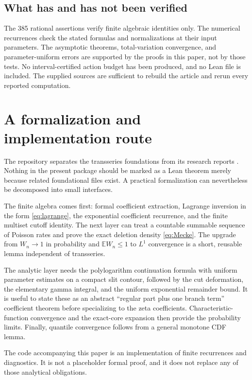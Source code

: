 \documentclass[11pt,a4paper]{article}
\theoremstyle{definition}\newtheorem{definition}[theorem]{Definition}
\theoremstyle{remark}\newtheorem{remark}[theorem]{Remark}
\newcommand{\E}{\mathbb E}
\newcommand{\1}{\mathbf 1}
\begin{document}
\subsection{What has and has not been verified}

The 385 rational assertions verify finite algebraic identities only.
The numerical recurrences check the stated formulas and normalizations
at their input parameters. The asymptotic theorems, total-variation
convergence, and parameter-uniform errors are supported by the proofs in
this paper, not by those tests. No interval-certified action budget has
been produced, and no Lean file is included. The supplied sources are
sufficient to rebuild the article and rerun every reported computation.

\section{A formalization and implementation route}
\label{sec:formalization}

The repository separates the transseries foundations from its research
reports \cite{repo-index}. Nothing in the present package should be
marked as a Lean theorem merely because related foundational files
exist. A practical formalization can nevertheless be decomposed into
small interfaces.

The finite algebra comes first: formal coefficient extraction,
Lagrange inversion in the form \eqref{eq:lagrange}, the exponential
coefficient recurrence, and the finite multiset cutoff identity. The
next layer can treat a countable summable sequence of Poisson rates and
prove the exact deletion density \eqref{eq:Mecke}. The upgrade from
$W_n\to1$ in probability and $\E W_n\le1$ to $L^1$ convergence is a
short, reusable lemma independent of transseries.

The analytic layer needs the polylogarithm continuation formula with
uniform parameter estimates on a compact slit contour, followed by the
cut deformation, the elementary gamma integral, and the uniform
exponential remainder bound. It is useful to state these as an abstract
``regular part plus one branch term'' coefficient theorem before
specializing to the zeta coefficients. Characteristic-function
convergence and the exact-core expansion then provide the probability
limits. Finally, quantile convergence follows from a general monotone
CDF lemma.

The code accompanying this paper is an implementation of finite
recurrences and diagnostics. It is not a placeholder formal proof, and
it does not replace any of those analytical obligations.
\end{document}
